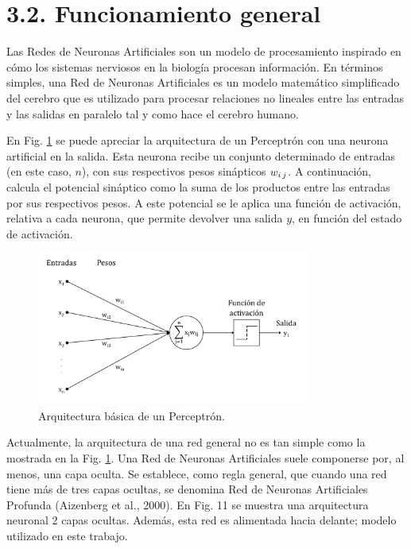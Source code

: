 \documentclass[spanish,a4paper,12pt,twoside]{report}
\begin{document}
    \section*{\Large 3.2. Funcionamiento general}
    Las Redes de Neuronas Artificiales son un modelo de procesamiento inspirado en cómo los sistemas nerviosos en la biología procesan información. En términos simples, una Red de Neuronas Artificiales es un modelo matemático simplificado del cerebro que es utilizado para procesar relaciones no lineales entre las entradas y las salidas en paralelo tal y como hace el cerebro humano. \par
    En Fig. \ref{fig:10} se puede apreciar la arquitectura de un Perceptrón con una neurona artificial en la salida. Esta neurona recibe un conjunto determinado de entradas (en este caso, $n$), con sus respectivos pesos sinápticos $w_{i\thinspace j}$. A continuación, calcula el potencial sináptico como la suma de los productos entre las entradas por sus respectivos pesos. A este potencial se le aplica una función de activación, relativa a cada neurona, que permite devolver una salida $y$, en función del estado de activación. \par
    \begin{figure}[H]
      \centering
      \includegraphics[width = 0.8\textwidth]{resources/Fig10.pdf}
      \caption{Arquitectura básica de un Perceptrón.}
      \label{fig:10}
    \end{figure} \par
    Actualmente, la arquitectura de una red general no es tan simple como la mostrada en la Fig. \ref{fig:10}. Una Red de Neuronas Artificiales suele componerse por, al menos, una capa oculta. Se establece, como regla general, que cuando una red tiene más de tres capas ocultas, se denomina Red de Neuronas Artificiales Profunda (Aizenberg et al., 2000). En Fig. 11 se muestra una arquitectura neuronal 2 capas ocultas. Además, esta red es alimentada hacia delante; modelo utilizado en este trabajo. \par
\end{document}
